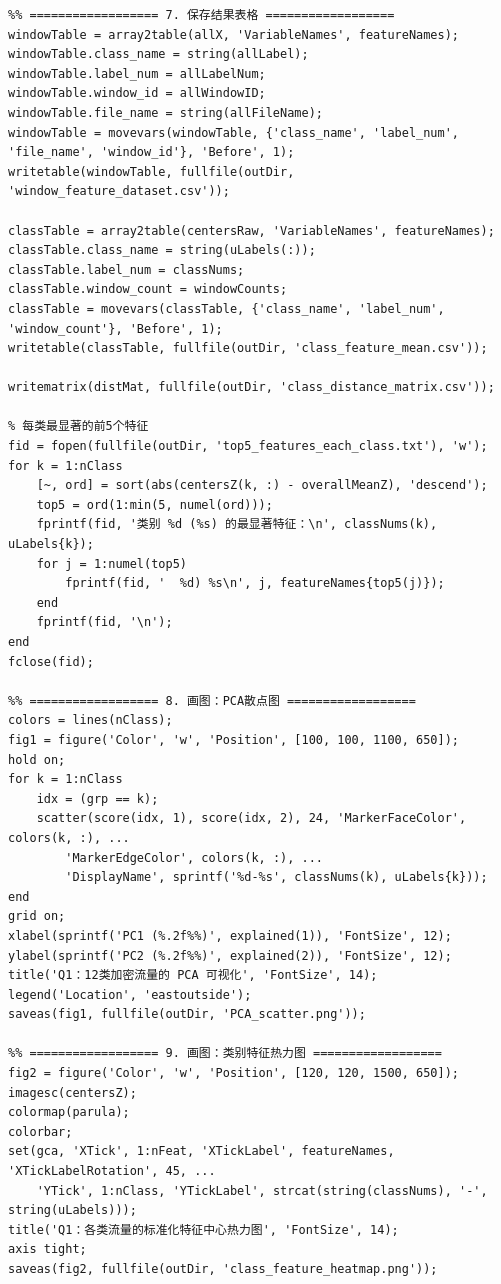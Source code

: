 \documentclass[UTF8,a4paper,12pt]{ctexart}
\begin{document}
\begin{lstlisting}
%% ================== 7. 保存结果表格 ==================
windowTable = array2table(allX, 'VariableNames', featureNames);
windowTable.class_name = string(allLabel);
windowTable.label_num = allLabelNum;
windowTable.window_id = allWindowID;
windowTable.file_name = string(allFileName);
windowTable = movevars(windowTable, {'class_name', 'label_num', 'file_name', 'window_id'}, 'Before', 1);
writetable(windowTable, fullfile(outDir, 'window_feature_dataset.csv'));

classTable = array2table(centersRaw, 'VariableNames', featureNames);
classTable.class_name = string(uLabels(:));
classTable.label_num = classNums;
classTable.window_count = windowCounts;
classTable = movevars(classTable, {'class_name', 'label_num', 'window_count'}, 'Before', 1);
writetable(classTable, fullfile(outDir, 'class_feature_mean.csv'));

writematrix(distMat, fullfile(outDir, 'class_distance_matrix.csv'));

% 每类最显著的前5个特征
fid = fopen(fullfile(outDir, 'top5_features_each_class.txt'), 'w');
for k = 1:nClass
    [~, ord] = sort(abs(centersZ(k, :) - overallMeanZ), 'descend');
    top5 = ord(1:min(5, numel(ord)));
    fprintf(fid, '类别 %d (%s) 的最显著特征：\n', classNums(k), uLabels{k});
    for j = 1:numel(top5)
        fprintf(fid, '  %d) %s\n', j, featureNames{top5(j)});
    end
    fprintf(fid, '\n');
end
fclose(fid);

%% ================== 8. 画图：PCA散点图 ==================
colors = lines(nClass);
fig1 = figure('Color', 'w', 'Position', [100, 100, 1100, 650]);
hold on;
for k = 1:nClass
    idx = (grp == k);
    scatter(score(idx, 1), score(idx, 2), 24, 'MarkerFaceColor', colors(k, :), ...
        'MarkerEdgeColor', colors(k, :), ...
        'DisplayName', sprintf('%d-%s', classNums(k), uLabels{k}));
end
grid on;
xlabel(sprintf('PC1 (%.2f%%)', explained(1)), 'FontSize', 12);
ylabel(sprintf('PC2 (%.2f%%)', explained(2)), 'FontSize', 12);
title('Q1：12类加密流量的 PCA 可视化', 'FontSize', 14);
legend('Location', 'eastoutside');
saveas(fig1, fullfile(outDir, 'PCA_scatter.png'));

%% ================== 9. 画图：类别特征热力图 ==================
fig2 = figure('Color', 'w', 'Position', [120, 120, 1500, 650]);
imagesc(centersZ);
colormap(parula);
colorbar;
set(gca, 'XTick', 1:nFeat, 'XTickLabel', featureNames, 'XTickLabelRotation', 45, ...
    'YTick', 1:nClass, 'YTickLabel', strcat(string(classNums), '-', string(uLabels)));
title('Q1：各类流量的标准化特征中心热力图', 'FontSize', 14);
axis tight;
saveas(fig2, fullfile(outDir, 'class_feature_heatmap.png'));


\end{lstlisting}
\end{document}
